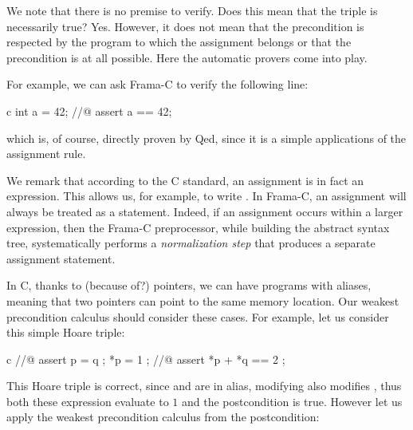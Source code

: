 We note that there is no premise to verify. Does this mean that the
triple is necessarily true? Yes. However, it does not mean that the
precondition is respected by the program to which the assignment belongs
or that the precondition is at all possible. Here the automatic provers
come into play.



For example, we can ask Frama-C to verify the following line:



\begin{CodeBlock}{c}
int a = 42;
//@ assert a == 42;
\end{CodeBlock}



which is, of course, directly proven by Qed, since it is a simple
applications of the assignment rule.



\begin{Information}
  We remark that according to the C standard, an assignment is in fact an
  expression. This allows us, for example, to write
  .
  In Frama-C, an assignment will always be treated as a statement. Indeed,
  if an assignment occurs within a larger expression, then the Frama-C
  preprocessor, while building the abstract syntax tree, systematically
  performs a \emph{normalization step} that produces a separate assignment
  statement.
\end{Information}






In C, thanks to (because of?) pointers, we can have programs with aliases,
meaning that two pointers can point to the same memory location. Our weakest
precondition calculus should consider these cases. For example, let us consider
this simple Hoare triple:


\begin{CodeBlock}{c}
//@ assert p = q ;
*p = 1 ;
//@ assert *p + *q == 2 ;
\end{CodeBlock}



This Hoare triple is correct, since  and  are in
alias, modifying  also modifies , thus both these
expression evaluate to $1$ and the postcondition is true. However let us apply
the weakest precondition calculus from the postcondition:



